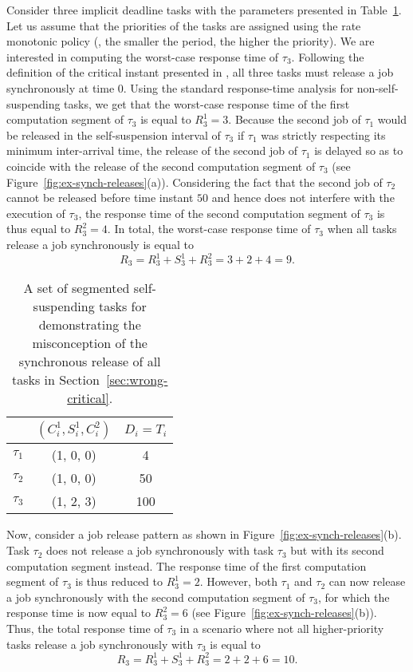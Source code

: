 Consider three implicit deadline tasks with the parameters presented in Table~\ref{table:ex-synch-releases}. Let us assume that the priorities of the tasks are assigned using the rate monotonic policy (\ie, the smaller the period, the higher the priority). We are interested in computing the worst-case response time of $\tau_3$. Following the definition of the critical instant presented in \cite{LR:rtas10}, all three tasks must release a job synchronously at time $0$. Using the standard response-time analysis for non-self-suspending tasks, we get that the worst-case response time of the first computation segment of $\tau_3$ is equal to $R_3^1 = 3$. Because the second job of $\tau_1$ would be released in the self-suspension interval of $\tau_3$ if $\tau_1$ was strictly respecting its minimum inter-arrival time, the release of the second job of $\tau_1$ is delayed so as to coincide with the release of the second computation segment of $\tau_3$ (see Figure~\ref{fig:ex-synch-releases}(a)). Considering the fact that the second job of $\tau_2$ cannot be released before time instant $50$ and hence does not interfere with the execution of $\tau_3$, the response time of the second computation segment of $\tau_3$ is thus equal to $R_3^2=4$. In total, the worst-case response time of $\tau_3$ when all tasks release a job synchronously is equal to 
$$R_3 = R_3^1 + S_3^1 + R_3^2 = 3 + 2 +4 = 9.$$

\begin{table}[t] 
\centering
    \begin{tabular}{|c|c|c|}
 \hline
        & $(C_i^1, S_i^1, C_i^2)$ &  $D_i=T_i$\\ 
        \hline
        $\tau_1$ & (1, 0, 0) &  4\\ 
        $\tau_2$ &  (1, 0, 0) & 50  \\ 
        $\tau_3$ & (1, 2, 3) & 100  \\
        \hline
    \end{tabular} 
    \caption{A set of segmented self-suspending tasks for demonstrating the misconception
of the synchronous release of all tasks in Section~\ref{sec:wrong-critical}.}
    \label{table:ex-synch-releases}
\end{table}

Now, consider a job release pattern as shown in Figure~\ref{fig:ex-synch-releases}(b). Task $\tau_2$ does not release a job synchronously with task $\tau_3$ but with its second computation segment instead. The response time of the first computation segment of $\tau_3$ is thus reduced to $R_3^1=2$. However, both $\tau_1$ and $\tau_2$ can now release a job synchronously with the second computation segment of $\tau_3$, for which the response time is now equal to $R_3^2=6$ (see Figure~\ref{fig:ex-synch-releases}(b)). Thus, the total response time of $\tau_3$ in a scenario where not all higher-priority tasks release a job synchronously with $\tau_3$ is equal to 
$$R_3 = R_3^1 + S_3^1 + R_3^2 = 2+2+6 = 10.$$

